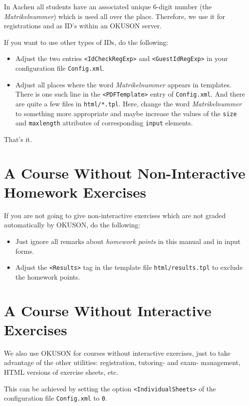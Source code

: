 \documentclass[12pt,openany,a4paper]{book}
\newcommand{\OKUSON}{\textsf{OKUSON}}
\begin{document}
In Aachen all students have an associated  unique 6-digit number 
(the \emph{Matrikelnummer}) which is used all over the place. 
Therefore, we use it for registrations and as ID's within an {\OKUSON}
server. 

If you want to use other types of IDs, do the following:

\begin{itemize}
\item Adjust the two entries \texttt{<IdCheckRegExp>} and
\texttt{<GuestIdRegExp>} in your configuration file \texttt{Config.xml}.
\item Adjust all places where the word \emph{Matrikelnummer} appears in
templates.  There is one such line in the \texttt{<PDFTemplate>} entry of
\texttt{Config.xml}. And there are quite a few files in \texttt{html/*.tpl}. 
Here, change the word \emph{Matrikelnummer} to something more appropriate
and maybe increase the values of the \texttt{size} and \texttt{maxlength} 
attributes of corresponding \texttt{input} elements.
\end{itemize}

That's it.

\section{A Course Without Non-Interactive Homework Exercises}

If you are not going to give non-interactive exercises which are not graded
automatically by {\OKUSON}, do the following:

\begin{itemize}
\item Just ignore all remarks about \emph{homework points} in this manual 
and in input forms. 
\item Adjust the \texttt{<Results>} tag in the template file
\texttt{html/results.tpl} to exclude the homework points.
\end{itemize}

\section{A Course Without Interactive Exercises}

We also use {\OKUSON} for courses without interactive exercises, just to
take advantage of the other utilities: registration, tutoring- and  exam-
management, HTML versions of exercise sheets, etc.

This can be achieved by setting the option \texttt{<IndividualSheets>} of 
the configuration file \texttt{Config.xml} to \texttt{0}.
\end{document}

